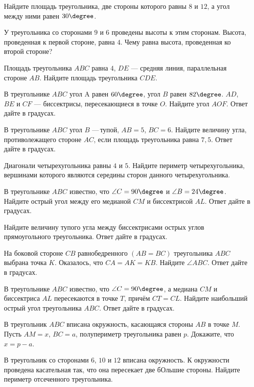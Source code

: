 %
\begin{class}[number=4]
	\begin{listofex}
		\item Найдите площадь треугольника, две стороны которого равны \( 8 \) и \( 12 \), а угол между ними равен \( 30\degree \).
		\item У треугольника со сторонами \( 9 \) и \( 6 \) проведены высоты к этим сторонам. Высота, проведенная к первой стороне, равна \( 4 \). Чему равна высота, проведенная ко второй стороне?
		\item Площадь треугольника \( ABC \) равна \( 4 \), \( DE \) --- средняя линия, параллельная стороне \( AB \). Найдите площадь треугольника \( CDE \).
		\item В треугольнике \( ABC \) угол A равен \( 60\degree \), угол \( B \) равен \( 82\degree \). \( AD \), \( BE \) и \( CF \) --- биссектрисы, пересекающиеся в точке \( O \). Найдите угол \( AOF \). Ответ дайте в градусах.
		\item В треугольнике \( ABC \) угол \( B \) --- тупой, \( AB = 5 \), \( BC = 6 \). Найдите величину угла, противолежащего стороне \( AC \), если площадь треугольника равна \( 7,5 \). Ответ дайте в градусах.
		\item Диагонали четырехугольника равны \( 4 \) и \( 5 \). Найдите периметр четырехугольника, вершинами которого являются середины сторон данного четырехугольника.
		\item В треугольнике \( ABC \) известно, что \( \angle C =90\degree \) и \( \angle B=24\degree \). Найдите острый угол между его медианой \( CM \) и биссектрисой \( AL \). Ответ дайте в градусах.
		\item Найдите величину тупого угла между биссектрисами острых углов прямоугольного треугольника. Ответ дайте в градусах.
		\item На боковой стороне \( CB \) равнобедренного \( (AB=BC) \) треугольника
		\( ABC \) выбрана точка \( K \). Оказалось, что \( CA = AK = KB \). Найдите \( \angle ABC \). Ответ дайте в градусах.
		\item В треугольнике \( ABC \) известно, что \( \angle C =90\degree \), а медиана \( CM \) и биссектриса \( AL \) пересекаются в точке \( T \), причём \( CT = CL \).
		Найдите наибольший острый угол треугольника \( ABC \). Ответ
		дайте в градусах.
		\item В треугольник \( ABC \) вписана окружность, касающаяся стороны \( AB \) в точке \( M \). Пусть \( AM = x \), \( BC = a \), полупериметр треугольника равен \( p \). Докажите, что \( x = p - a \).
		\item В треугольник со сторонами \( 6 \), \( 10 \) и \( 12 \) вписана окружность. К окружности проведена касательная так, что
		она пересекает две бОльшие стороны. Найдите периметр отсеченного треугольника.
	\end{listofex}
\end{class}
